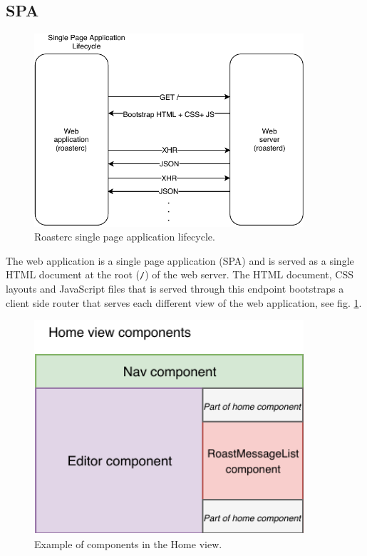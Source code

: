 \documentclass[12pt,a4paper]{report}
\begin{document}
\subsection{SPA}
\begin{figure}[H]
    \centering
    \includegraphics[width=10cm]{spa-lifecycle.pdf}
    \caption{Roasterc single page application lifecycle.}
    \label{fig:roasterc-lifecycle}
\end{figure}

The web application is a single page application (SPA) and is served as a single HTML document at the root (\texttt{/}) of the web server. The HTML document, CSS layouts and JavaScript files that is served through this endpoint bootstraps a client side router that serves each different view of the web application, see fig. \ref{fig:roasterc-lifecycle}.

\begin{figure}[H]
    \centering
    \includegraphics[width=10cm]{home-view-components.pdf}
    \caption{Example of components in the Home view.}
    \label{fig:home-view-components}
\end{figure}
\end{document}
